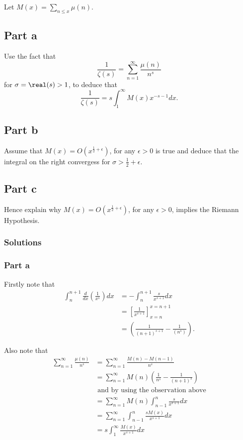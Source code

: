 \documentclass{unswmaths}
\begin{document}
Let $ M(x) = \sum_{n \leq x} \mu(n) $.

\subsection*{Part a}

Use the fact that 
$$
	\frac{1}{\zeta(s)} = \sum_{n =1}^\infty \frac{\mu(n)}{n^s}
$$
for $ \sigma = \real(s) > 1 $, to deduce that 
$$
	\frac{1}{\zeta(s)} = s \int_1^\infty M(x)x^{-s-1} dx.
$$

\subsection*{Part b}
Assume that $ M(x) = O(x^{\frac{1}{2} + \epsilon}) $, for any $ \epsilon > 0 $ is true and deduce 
that the integral on the right convergess for $ \sigma > \frac{1}{2} + \epsilon $.

\subsection*{Part c}

Hence explain why $ M(x) = O(x^{\frac{1}{2} + \epsilon}) $, for any $ \epsilon > 0 $, implies the Riemann Hypothesis.

\subsubsection*{Solutions}

\subsubsection*{Part a}

Firstly note that
\begin{align*}
	\int_{n}^{n+1} \frac{d}{dx}\left( \frac{1}{x^s} \right) dx &= -\int_{n}^{n+1}\frac{s}{x^{s+1}}dx \\
		&= \left[ \frac{1}{x^{s+1}} \right]_{x = n}^{x=n+1} \\
		&= \left( \frac{1}{(n+1)^{s+1}} - \frac{1}{(n^s)} \right).
\end{align*}

Also note that
\begin{align*}
	\sum_{n=1}^\infty \frac{\mu(n)}{n^s} &= \sum_{n=1}^\infty \frac{M(n) - M(n-1)}{n^s} \\
		&= \sum_{n=1}^\infty M(n) \left( \frac{1}{n^s} - \frac{1}{(n+1)^s} \right) \\
		& \text{ and by using the observation above} \\
		&= \sum_{n=1}^\infty M(n) \int_{n-1}^n \frac{s}{x^{s+1}} dx \\
		&= \sum_{n=1}^\infty \int_{n-1}^n \frac{s M(x)}{x^{s+1}} dx \\
		&= s \int_1^\infty\frac{M(x)}{x^{s+1}} dx
\end{align*}
\end{document}
